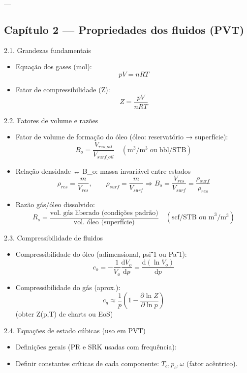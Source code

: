 \documentclass[11pt,a4paper]{article}
\begin{document}
---

\subsection{Capítulo 2 — Propriedades dos fluidos (PVT)}

2.1. Grandezas fundamentais
\begin{itemize}
\item Equação dos gases (mol):
$$pV=nRT$$
\item Fator de compressibilidade (Z):
$$Z=\dfrac{pV}{nRT}$$
\end{itemize}

2.2. Fatores de volume e razões
\begin{itemize}
\item Fator de volume de formação do óleo (óleo: reservatório → superfície):
$$B_o=\dfrac{V_{res\_oil}}{V_{surf\_oil}}\quad(\text{m}^3/\text{m}^3\;\text{ou bbl/STB})$$
\item Relação densidade ↔ B_o: massa invariável entre estados
$$\rho_{res} = \dfrac{m}{V_{res}},\qquad \rho_{surf}=\dfrac{m}{V_{surf}}\Rightarrow B_o=\dfrac{V_{res}}{V_{surf}}=\dfrac{\rho_{surf}}{\rho_{res}}$$
\end{itemize}

\begin{itemize}
\item Razão gás/óleo dissolvido:
$$R_s=\dfrac{\text{vol. gás liberado (condições padrão)}}{\text{vol. óleo (superfície)}}\quad(\text{scf/STB ou m}^3/\text{m}^3)$$
\end{itemize}

2.3. Compressibilidade de fluidos
\begin{itemize}
\item Compressibilidade do óleo (adimensional, psi⁻1 ou Pa⁻1):
$$c_o = -\dfrac{1}{V_o}\dfrac{\mathrm{d}V_o}{\mathrm{d}p}=\dfrac{\mathrm{d}(\ln V_o)}{\mathrm{d}p}$$
\item Compressibilidade do gás (aprox.):
$$c_g \approx \dfrac{1}{p}\left(1-\dfrac{\partial\ln Z}{\partial\ln p}\right)$$
(obter Z(p,T) de charts ou EoS)
\end{itemize}

2.4. Equações de estado cúbicas (uso em PVT)
\begin{itemize}
\item Definições gerais (PR e SRK usadas com frequência):
\item Definir constantes críticas de cada componente: $T_c, p_c, \omega$ (fator acêntrico).
\end{itemize}
\end{document}

